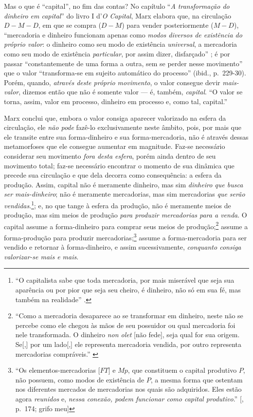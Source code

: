 \documentclass[12pt]{article}
\numberwithin{equation}{section}
\theoremstyle{plain}
\theoremstyle{definition}
\theoremstyle{remark}
\begin{document}
Mas o que é ``capital'', no fim das contas? No capítulo ``\emph{A transformação do dinheiro em capital}'' do livro I d'\emph{O Capital}, Marx elabora que, na circulação $D-M-D$, em que se compra ($D-M$) para vender posteriormente ($M-D$), ``mercadoria e dinheiro funcionam apenas como \emph{modos diversos de existência do próprio valor}: o dinheiro como seu modo de existência \emph{universal}, a mercadoria como seu modo de existência \emph{particular}, por assim dizer, disfarçado'' \parencite[p. 229, grifo meu]{Marx2017}; é por passar ``constantemente de uma forma a outra, sem se perder nesse movimento'' que o valor ``transforma-se em sujeito automático do processo'' (ibid., p.~229-30). Porém, quando, \emph{através deste próprio movimento}, o valor consegue devir \emph{mais-valor}, dizemos então que não é somente valor --- é, também, \emph{capital}. ``O valor se torna, assim, valor em processo, dinheiro em processo e, como tal, capital.'' \parencite[p. 231]{Marx2017}

Marx conclui que, embora o valor consiga aparecer valorizado na esfera da circulação, ele \emph{não pode} fazê-lo exclusivamente neste âmbito, pois, por mais que ele transite entre sua forma-dinheiro e sua forma-mercadoria, não é através dessas metamorfoses que ele consegue aumentar em magnitude. Faz-se necessário considerar seu movimento \emph{fora desta esfera}, porém ainda dentro de seu movimento total; faz-se necessário encontrar o momento de sua dinâmica que precede sua circulação e que dela decorra como consequência: a esfera da produção. Assim, capital não é meramente dinheiro, mas sim \emph{dinheiro que busca ser mais-dinheiro}; não é meramente mercadorias, mas sim mercadorias \emph{que serão vendidas}.\footnote{``O capitalista sabe que toda mercadoria, por mais miserável que seja sua aparência ou por pior que seja seu cheiro, é dinheiro, não só em sua fé, mas também na realidade'' \parencite[p. 230]{Marx2017}.}; e, no que tange à esfera da produção, não é meramente meios de produção, mas sim meios de produção \emph{para produzir mercadorias para a venda}. O capital assume a forma-dinheiro para comprar seus meios de produção;\footnote{``Como a mercadoria desaparece ao se transformar em dinheiro, neste não se percebe como ele chegou às mãos de seu possuidor ou qual mercadoria foi nele transformada. O dinheiro \emph{non olet} {[}não fede{]}, seja qual for sua origem. Se{[},{]} por um lado{[},{]} ele representa mercadoria vendida, por outro representa mercadorias compráveis.'' \parencite[p. 184]{Marx2017}} assume a forma-produção para produzir mercadorias;\footnote{``Os elementos-mercadorias {[}$FT${]} e $Mp$, que constituem o capital produtivo $P$, não possuem, como modos de existência de $P$, a mesma forma que ostentam nos diferentes mercados de mercadorias nos quais são adquiridos. Eles estão agora \emph{reunidos} e, \emph{nessa conexão, podem funcionar como capital produtivo}.'' {[}\textcite{Marx2014}, p.~174; grifo meu{]}} assume a forma-mercadoria para ser vendido e retornar à forma-dinheiro, e assim sucessivamente, \emph{conquanto consiga valorizar-se mais e mais}.
\end{document}

